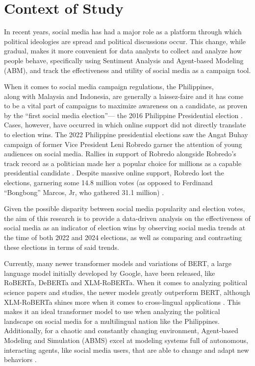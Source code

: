 \section{Context of Study}
In recent years, social media has had a major role as a platform through which political ideologies are spread and political discussions occur. This change, while gradual, makes it more convenient for data analysts to collect and analyze how people behave, specifically using Sentiment Analysis and Agent-based Modeling (ABM), and track the effectiveness and utility of social media as a campaign tool.

When it comes to social media campaign regulations, the Philippines,\\
along with Malaysia and Indonesia, are generally a laissez-faire and it has come to be a vital part of campaigns to maximize awareness on a candidate, as proven by the “first social media election”— the 2016 Philippine Presidential election \cite{Tapsell-2020, Sinpeng-2020}. Cases, however, have occurred in which online support did not directly translate to election wins. The 2022 Philippine presidential elections saw the Angat Buhay campaign of former Vice President Leni Robredo garner the attention of young audiences on social media. Rallies in support of Robredo alongside Robredo’s track record as a politician made her a popular choice for millions as a capable presidential candidate \cite{Johnson-2022}. Despite massive online support, Robredo lost the elections, garnering some 14.8 million votes (as opposed to Ferdinand “Bongbong” Marcos, Jr, who gathered 31.1 million) \cite{ABSCBN-2022}.

Given the possible disparity between social media popularity and election votes, the aim of this research is to provide a data-driven analysis on the effectiveness of social media as an indicator of election wins by observing social media trends at the time of both 2022 and 2024 elections, as well as comparing and contrasting these elections in terms of said trends.

Currently, many newer transformer models and variations of BERT, a large language model initially developed by Google, have been released, like\\
RoBERTa, DeBERTa and XLM-RoBERTa. When it comes to analyzing political science papers and studies, the newer models greatly outperform BERT, although XLM-RoBERTa shines more when it comes to cross-lingual applications \cite{Timoneda-2025}. This makes it an ideal transformer model to use when analyzing the political landscape on social media for a multilingual nation like the Philippines. Additionally, for a chaotic and constantly changing environment, Agent-based Modeling and Simulation (ABMS) excel at modeling systems full of autonomous, interacting agents, like social media users, that are able to change and adapt new behaviors \cite{Macal-2009}.

